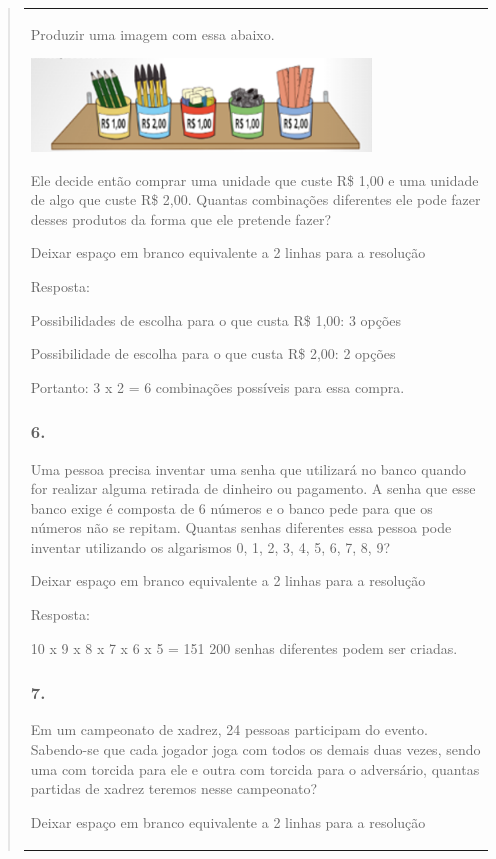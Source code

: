 \begin{enumerate}
\begin{escolha}
\begin{enumerate}
\begin{itemize}
\begin{itemize}
\begin{escolha}
\begin{quote}
\begin{escolha}
{\begin{longtable}[]{@{}l@{}}
\begin{itemize}
Produzir uma imagem com essa abaixo.

\includegraphics[width=3.55864in,height=0.97508in]{media/image139.png}

Ele decide então comprar uma unidade que custe R\$ 1,00 e uma unidade de
algo que custe R\$ 2,00. Quantas combinações diferentes ele pode fazer
desses produtos da forma que ele pretende fazer?

Deixar espaço em branco equivalente a 2 linhas para a resolução

Resposta:

Possibilidades de escolha para o que custa R\$ 1,00: 3 opções

Possibilidade de escolha para o que custa R\$ 2,00: 2 opções

Portanto: 3 x 2 = 6 combinações possíveis para essa compra.

\subsubsection{6.}\label{section-135}

Uma pessoa precisa inventar uma senha que utilizará no banco quando for
realizar alguma retirada de dinheiro ou pagamento. A senha que esse
banco exige é composta de 6 números e o banco pede para que os números
não se repitam. Quantas senhas diferentes essa pessoa pode inventar
utilizando os algarismos 0, 1, 2, 3, 4, 5, 6, 7, 8, 9?

Deixar espaço em branco equivalente a 2 linhas para a resolução

Resposta:

10 x 9 x 8 x 7 x 6 x 5 = 151 200 senhas diferentes podem ser criadas.

\subsubsection{7.}\label{section-136}

Em um campeonato de xadrez, 24 pessoas participam do evento. Sabendo-se
que cada jogador joga com todos os demais duas vezes, sendo uma com
torcida para ele e outra com torcida para o adversário, quantas partidas
de xadrez teremos nesse campeonato?

Deixar espaço em branco equivalente a 2 linhas para a resolução


\end{itemize}
\end{longtable}}
\end{escolha}
\end{quote}
\end{escolha}
\end{itemize}
\end{itemize}
\end{enumerate}
\end{escolha}
\end{enumerate}
